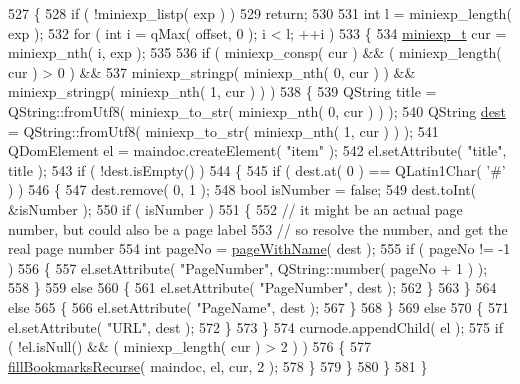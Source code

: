 \begin{DoxyCode}
527 \{
528     \textcolor{keywordflow}{if} ( !miniexp\_listp( exp ) )
529         \textcolor{keywordflow}{return};
530 
531     \textcolor{keywordtype}{int} l = miniexp\_length( exp );
532     \textcolor{keywordflow}{for} ( \textcolor{keywordtype}{int} i = qMax( offset, 0 ); i < l; ++i )
533     \{
534         \hyperlink{kdjvu_8h_a58955b1a7edfc6e6ccb48402f744802b}{miniexp\_t} cur = miniexp\_nth( i, exp );
535 
536         \textcolor{keywordflow}{if} ( miniexp\_consp( cur ) && ( miniexp\_length( cur ) > 0 ) &&
537              miniexp\_stringp( miniexp\_nth( 0, cur ) ) && miniexp\_stringp( miniexp\_nth( 1, cur ) ) )
538         \{
539             QString title = QString::fromUtf8( miniexp\_to\_str( miniexp\_nth( 0, cur ) ) );
540             QString \hyperlink{synctex__parser__utils_8c_a723e06ace24a60ed94dca199595c08d2}{dest} = QString::fromUtf8( miniexp\_to\_str( miniexp\_nth( 1, cur ) ) );
541             QDomElement el = maindoc.createElement( \textcolor{stringliteral}{"item"} );
542             el.setAttribute( \textcolor{stringliteral}{"title"}, title );
543             \textcolor{keywordflow}{if} ( !dest.isEmpty() )
544             \{
545                 \textcolor{keywordflow}{if} ( dest.at( 0 ) == QLatin1Char( \textcolor{charliteral}{'#'} ) )
546                 \{
547                     dest.remove( 0, 1 );
548                     \textcolor{keywordtype}{bool} isNumber = \textcolor{keyword}{false};
549                     dest.toInt( &isNumber );
550                     \textcolor{keywordflow}{if} ( isNumber )
551                     \{
552                         \textcolor{comment}{// it might be an actual page number, but could also be a page label}
553                         \textcolor{comment}{// so resolve the number, and get the real page number}
554                         \textcolor{keywordtype}{int} pageNo = \hyperlink{classKDjVu_1_1Private_aaba1afe5cef39023edfae2f4333d2c10}{pageWithName}( dest );
555                         \textcolor{keywordflow}{if} ( pageNo != -1 )
556                         \{
557                             el.setAttribute( \textcolor{stringliteral}{"PageNumber"}, QString::number( pageNo + 1 ) );
558                         \}
559                         \textcolor{keywordflow}{else}
560                         \{
561                             el.setAttribute( \textcolor{stringliteral}{"PageNumber"}, dest );
562                         \}
563                     \}
564                     \textcolor{keywordflow}{else}
565                     \{
566                        el.setAttribute( \textcolor{stringliteral}{"PageName"}, dest );
567                     \}
568                 \}
569                 \textcolor{keywordflow}{else}
570                 \{
571                     el.setAttribute( \textcolor{stringliteral}{"URL"}, dest );
572                 \}
573             \}
574             curnode.appendChild( el );
575             \textcolor{keywordflow}{if} ( !el.isNull() && ( miniexp\_length( cur ) > 2 ) )
576             \{
577                 \hyperlink{classKDjVu_1_1Private_a880323dc9a820151abfbfd5ee2822665}{fillBookmarksRecurse}( maindoc, el, cur, 2 );
578             \}
579         \}
580     \}
581 \}
\end{DoxyCode}
